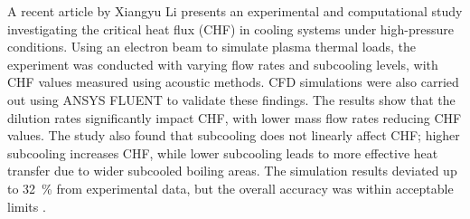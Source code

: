 \documentclass[a4paper]{article}
\begin{document}
\noindent A recent article by Xiangyu Li presents an experimental and computational study investigating the critical heat flux (CHF) in cooling systems under high-pressure conditions. Using an electron beam to simulate plasma thermal loads, the experiment was conducted with varying flow rates and subcooling levels, with CHF values measured using acoustic methods. CFD simulations were also carried out using ANSYS FLUENT to validate these findings. 
The results show that the dilution rates significantly impact CHF, with lower mass flow rates reducing CHF values. The study also found that subcooling does not linearly affect CHF; higher subcooling increases CHF, while lower subcooling leads to more effective heat transfer due to wider subcooled boiling areas. The simulation results deviated up to 32~\% from experimental data, but the overall accuracy was within acceptable limits \cite{Li2022}.



\pagebreak
\end{document}
